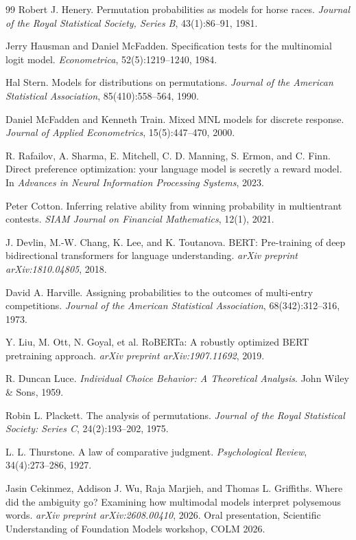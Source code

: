 \documentclass[11pt]{article}
\begin{document}
\begin{thebibliography}{99}
Robert J. Henery.
Permutation probabilities as models for horse races.
\emph{Journal of the Royal Statistical Society, Series B},
43(1):86--91, 1981.

Jerry Hausman and Daniel McFadden.
Specification tests for the multinomial logit model.
\emph{Econometrica}, 52(5):1219--1240, 1984.

Hal Stern.
Models for distributions on permutations.
\emph{Journal of the American Statistical Association},
85(410):558--564, 1990.

Daniel McFadden and Kenneth Train.
Mixed MNL models for discrete response.
\emph{Journal of Applied Econometrics}, 15(5):447--470, 2000.

R. Rafailov, A. Sharma, E. Mitchell, C. D. Manning, S. Ermon, and C. Finn.
Direct preference optimization: your language model is secretly a reward
model.
In \emph{Advances in Neural Information Processing Systems}, 2023.

Peter Cotton.
Inferring relative ability from winning probability in multientrant
contests.
\emph{SIAM Journal on Financial Mathematics}, 12(1), 2021.

J. Devlin, M.-W. Chang, K. Lee, and K. Toutanova.
BERT: Pre-training of deep bidirectional transformers for language
understanding.
\emph{arXiv preprint arXiv:1810.04805}, 2018.

David A. Harville.
Assigning probabilities to the outcomes of multi-entry competitions.
\emph{Journal of the American Statistical Association},
68(342):312--316, 1973.

Y. Liu, M. Ott, N. Goyal, et al.
RoBERTa: A robustly optimized BERT pretraining approach.
\emph{arXiv preprint arXiv:1907.11692}, 2019.

R. Duncan Luce.
\emph{Individual Choice Behavior: A Theoretical Analysis}.
John Wiley \& Sons, 1959.

Robin L. Plackett.
The analysis of permutations.
\emph{Journal of the Royal Statistical Society: Series C},
24(2):193--202, 1975.

L. L. Thurstone.
A law of comparative judgment.
\emph{Psychological Review}, 34(4):273--286, 1927.

Jasin Cekinmez, Addison J. Wu, Raja Marjieh, and Thomas L. Griffiths.
Where did the ambiguity go? Examining how multimodal models interpret
polysemous words.
\emph{arXiv preprint arXiv:2608.00410}, 2026. Oral presentation,
Scientific Understanding of Foundation Models workshop, COLM 2026.


\end{thebibliography}
\end{document}

